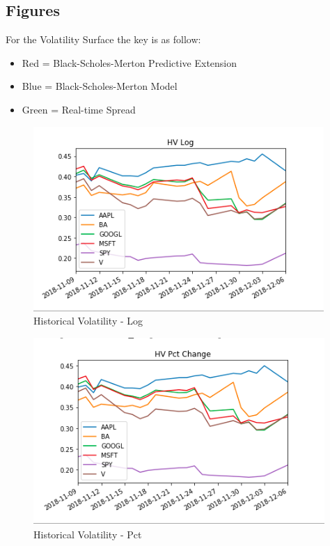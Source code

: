 \documentclass{article}
\begin{document}
\subsection{Figures}
For the Volatility Surface the key is as follow: 
\begin{itemize}
\item Red = Black-Scholes-Merton Predictive Extension
\item Blue = Black-Scholes-Merton Model
\item Green = Real-time Spread
\end{itemize}

\begin{figure}[h!]
\includegraphics[width =\textwidth]{images/HV/HV-LOG.png}
\caption{Historical Volatility - Log}
\centering
\end{figure}
\begin{figure}[h!]
\includegraphics[width =\textwidth]{images/HV/HV-PCT.png}
\caption{Historical Volatility - Pct}
\centering
\end{figure}
\end{document}
